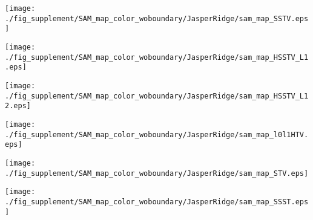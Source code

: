 \begin{figure*}[t]
	\begin{center}
		\begin{minipage}{0.15\hsize}
			\centerline{\texttt{[image: ./fig\_supplement/SAM\_map\_color\_woboundary/JasperRidge/sam\_map\_SSTV.eps]}} %
		\end{minipage}
		\begin{minipage}{0.15\hsize}
			\centerline{\texttt{[image: ./fig\_supplement/SAM\_map\_color\_woboundary/JasperRidge/sam\_map\_HSSTV\_L1.eps]}} %
		\end{minipage}
		\begin{minipage}{0.15\hsize}
			\centerline{\texttt{[image: ./fig\_supplement/SAM\_map\_color\_woboundary/JasperRidge/sam\_map\_HSSTV\_L12.eps]}} %
		\end{minipage}
		\begin{minipage}{0.15\hsize}
			\centerline{\texttt{[image: ./fig\_supplement/SAM\_map\_color\_woboundary/JasperRidge/sam\_map\_l0l1HTV.eps]}} %
		\end{minipage}
		\begin{minipage}{0.15\hsize}
			\centerline{\texttt{[image: ./fig\_supplement/SAM\_map\_color\_woboundary/JasperRidge/sam\_map\_STV.eps]}} %
		\end{minipage}
		\begin{minipage}{0.15\hsize}
			\centerline{\texttt{[image: ./fig\_supplement/SAM\_map\_color\_woboundary/JasperRidge/sam\_map\_SSST.eps]}} %
		\end{minipage}
		\begin{minipage}{0.050\hsize}
			\centerline{\hspace{\hsize}} %
		\end{minipage}
		
		\vspace{1mm}
		

\end{center}
\end{figure*}
